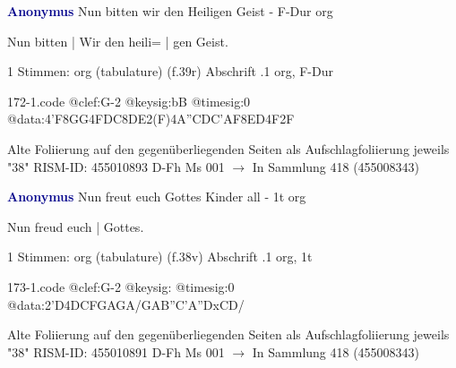 \documentclass[twocolumn]{book}
\begin{document}
\newline \par \vspace{7pt} \textcolor{darkblue}{\textbf{Anonymus  }}
\newline Nun bitten wir den Heiligen Geist - F-Dur
\newline org
\newline \begin{itshape}[f.39r, at left:] Nun bitten | Wir den heili= | gen Geist.\end{itshape} 
\newline \textcolor{darkblue}{}  1 Stimmen: org (tabulature)  (f.39r)
\newline Abschrift
.1  org, F-Dur  
\begin{filecontents*}{172-1.code}
@clef:G-2
@keysig:bB
@timesig:0
@data:4'F{8GG}4FDC{8DE}2(F)4A''CDC'AF{8ED}4F2F
\end{filecontents*}
\newline
%
\newline Alte Foliierung auf den gegenüberliegenden Seiten als Aufschlagfoliierung jeweils "38"
\newline RISM-ID: 455010893
\newline D-Fh  Ms 001
\newline $\rightarrow$ In Sammlung 418 (455008343)
      
\newline \par \vspace{7pt} \textcolor{darkblue}{\textbf{Anonymus  }}
\newline Nun freut euch Gottes Kinder all - 1t
\newline org
\newline \begin{itshape}[f.38v, at left:] Nun freud euch | Gottes.\end{itshape} 
\newline \textcolor{darkblue}{}  1 Stimmen: org (tabulature)  (f.38v)
\newline Abschrift
.1  org, 1t  
\begin{filecontents*}{173-1.code}
@clef:G-2
@keysig:
@timesig:0
@data:2'D4DCFGAGA/GAB''C'A''DxCD/
\end{filecontents*}
\newline
%
\newline Alte Foliierung auf den gegenüberliegenden Seiten als Aufschlagfoliierung jeweils "38"
\newline RISM-ID: 455010891
\newline D-Fh  Ms 001
\newline $\rightarrow$ In Sammlung 418 (455008343)
      
\end{document}
